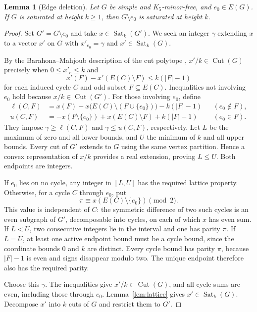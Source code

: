 \documentclass[10pt]{article}
\newtheorem{lemma}[theorem]{Lemma}
\theoremstyle{definition}
\theoremstyle{remark}
\DeclareMathOperator{\Cut}{Cut}
\DeclareMathOperator{\Sat}{Sat}
\begin{document}
\begin{lemma}[Edge deletion]\label{lem:deletion}
Let $G$ be simple and $K_5$-minor-free, and $e_0\in E(G)$.
If $G$ is saturated at height $k\geq1$, then $G\setminus e_0$ is saturated at height $k$.
\end{lemma}
\begin{proof}
Set $G'=G\setminus e_0$ and take $x\in\Sat_k(G')$.
We seek an integer $\gamma$ extending $x$ to a vector $x'$ on $G$ with $x'_{e_0}=\gamma$ and $x'\in\Sat_k(G)$.

By the Barahona--Mahjoub description of the cut polytope \cite[Proposition~2.1 and Corollary~2.2]{Ohsugi}, $x'/k\in\Cut(G)$ precisely when $0\leq x'_e\leq k$ and
\begin{equation}\label{eq:cycle}
 x'(F)-x'(E(C)\setminus F)\leq k(|F|-1)
\end{equation}
for each induced cycle $C$ and odd subset $F\subseteq E(C)$.
Inequalities not involving $e_0$ hold because $x/k\in\Cut(G')$.
For those involving $e_0$, define
\begin{align*}
 \ell(C,F)&=x(F)-x\bigl(E(C)\setminus(F\cup\{e_0\})\bigr)-k(|F|-1)
 &&(e_0\notin F),\\
 u(C,F)&=-x(F\setminus\{e_0\})+x(E(C)\setminus F)+k(|F|-1)
 &&(e_0\in F).
\end{align*}
They impose $\gamma\geq\ell(C,F)$ and $\gamma\leq u(C,F)$, respectively.
Let $L$ be the maximum of zero and all lower bounds, and $U$ the minimum of $k$ and all upper bounds.
Every cut of $G'$ extends to $G$ using the same vertex partition.
Hence a convex representation of $x/k$ provides a real extension, proving $L\leq U$.
Both endpoints are integers.

If $e_0$ lies on no cycle, any integer in $[L,U]$ has the required lattice property.
Otherwise, for a cycle $C$ through $e_0$, put
\[
 \pi\equiv x(E(C)\setminus\{e_0\})\pmod2.
\]
This value is independent of $C$: the symmetric difference of two such cycles is an even subgraph of $G'$, decomposable into cycles, on each of which $x$ has even sum.
If $L<U$, two consecutive integers lie in the interval and one has parity $\pi$.
If $L=U$, at least one active endpoint bound must be a cycle bound, since the coordinate bounds $0$ and $k$ are distinct.
Every cycle bound has parity $\pi$, because $|F|-1$ is even and signs disappear modulo two.
The unique endpoint therefore also has the required parity.

Choose this $\gamma$.
The inequalities give $x'/k\in\Cut(G)$, and all cycle sums are even, including those through $e_0$.
Lemma~\ref{lem:lattice} gives $x'\in\Sat_k(G)$.
Decompose $x'$ into $k$ cuts of $G$ and restrict them to $G'$.
\end{proof}
\end{document}
